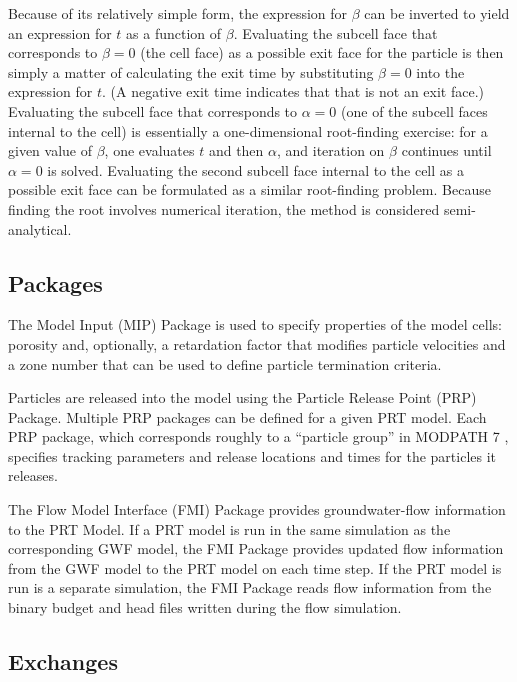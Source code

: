 Because of its relatively simple form, the expression for $\beta$ can be inverted to yield an expression for $t$ as a function of $\beta$. Evaluating the subcell face that corresponds to $\beta = 0$ (the cell face) as a possible exit face for the particle is then simply a matter of calculating the exit time by substituting $\beta = 0$ into the expression for $t$. (A negative exit time indicates that that is not an exit face.) Evaluating the subcell face that corresponds to $\alpha = 0$ (one of the subcell faces internal to the cell) is essentially a one-dimensional root-finding exercise: for a given value of $\beta$, one evaluates $t$ and then $\alpha$, and iteration on $\beta$ continues until $\alpha = 0$ is solved. Evaluating the second subcell face internal to the cell as a possible exit face can be formulated as a similar root-finding problem. Because finding the root involves numerical iteration, the method is considered semi-analytical.

\subsection{Packages} \label{sec:packages}

The Model Input (MIP) Package is used to specify properties of the model cells: porosity and, optionally, a retardation factor that modifies particle velocities and a zone number that can be used to define particle termination criteria.

Particles are released into the model using the Particle Release Point (PRP) Package. Multiple PRP packages can be defined for a given PRT model. Each PRP package, which corresponds roughly to a ``particle group'' in MODPATH 7 \citep{pollock2016modpath7}, specifies tracking parameters and release locations and times for the particles it releases.

The Flow Model Interface (FMI) Package provides groundwater-flow information to the PRT Model. If a PRT model is run in the same simulation as the corresponding GWF model, the FMI Package provides updated flow information from the GWF model to the PRT model on each time step. If the PRT model is run is a separate simulation, the FMI Package reads flow information from the binary budget and head files written during the flow simulation.

\subsection{Exchanges} \label{sec:exchanges}


